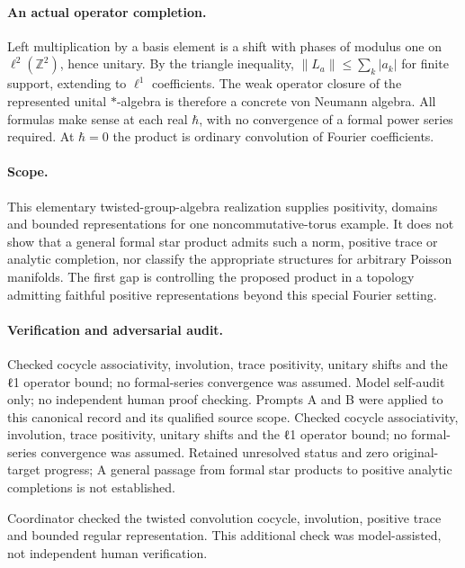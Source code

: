 \documentclass[11pt]{article}
\begin{document}
\paragraph{An actual operator completion.} Left multiplication by a basis element is a shift with phases of modulus one on $\ell^2(\mathbb Z^2)$, hence unitary. By the triangle inequality, $\|L_a\|\leq\sum_k|a_k|$ for finite support, extending to $\ell^1$ coefficients. The weak operator closure of the represented unital $*$-algebra is therefore a concrete von Neumann algebra. All formulas make sense at each real $\hbar$, with no convergence of a formal power series required. At $\hbar=0$ the product is ordinary convolution of Fourier coefficients.

\paragraph{Scope.} This elementary twisted-group-algebra realization supplies positivity, domains and bounded representations for one noncommutative-torus example. It does not show that a general formal star product admits such a norm, positive trace or analytic completion, nor classify the appropriate structures for arbitrary Poisson manifolds. The first gap is controlling the proposed product in a topology admitting faithful positive representations beyond this special Fourier setting.

\paragraph{Verification and adversarial audit.}
Checked cocycle associativity, involution, trace positivity, unitary shifts and the ℓ1 operator bound; no formal-series convergence was assumed. Model self-audit only; no independent human proof checking. Prompts A and B were applied to this canonical record and its qualified source scope. Checked cocycle associativity, involution, trace positivity, unitary shifts and the ℓ1 operator bound; no formal-series convergence was assumed. Retained unresolved status and zero original-target progress; A general passage from formal star products to positive analytic completions is not established.

Coordinator checked the twisted convolution cocycle, involution, positive trace and bounded regular representation. This additional check was model-assisted, not independent human verification.
\end{document}
